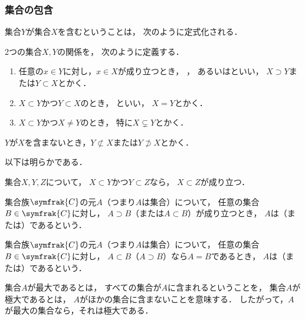 \documentclass[../sotsu.tex]{subfiles}
\begin{document}

\subsubsection*{集合の包含}

集合$Y$が集合$X$を含むということは，
次のように定式化される．

\begin{definition}
    2つの集合$X, Y$の関係を，
    次のように定義する．
    \begin{enumerate}
        \item 任意の$x \in Y$に対し，$x \in X$が成り立つとき，
            ，
            あるいはといい，
            $X \supset Y$または$Y \subset X$とかく．
        \item $X \subset Y$かつ$Y \subset X$のとき，
            といい，
            $X = Y$とかく．
        \item $X \subset Y$かつ$X \neq Y$のとき，
            特に$X \subsetneq Y$とかく．
    \end{enumerate}
    $Y$が$X$を含まないとき，$Y \not\subset X$または$Y \not\supset X$とかく．
\end{definition}

以下は明らかである．

\begin{proposition}
    集合$X, Y, Z$について，
    $X \subset Y$かつ$Y \subset Z$なら，
    $X \subset Z$が成り立つ．
\end{proposition}




\begin{definition}[最大・最小]
    集合族$\symfrak{C}$の元$A$（つまり$A$は集合）について，
    任意の集合$B \in \symfrak{C}$に対し，
    $A \supset B$（または$A \subset B$）が成り立つとき，
    $A$は（または）であるという．
\end{definition}


\begin{definition}[極大・極小]
    集合族$\symfrak{C}$の元$A$（つまり$A$は集合）について，
    任意の集合$B \in \symfrak{C}$に対し，
    $A \subset B$（$A \supset B$）なら$A = B$であるとき，
    $A$は（または）であるという．
\end{definition}


集合$A$が最大であるとは，
すべての集合が$A$に含まれるということを，
集合$A$が極大であるとは，
$A$がほかの集合に含まないことを意味する．
したがって，$A$が最大の集合なら，それは極大である．
\end{document}
